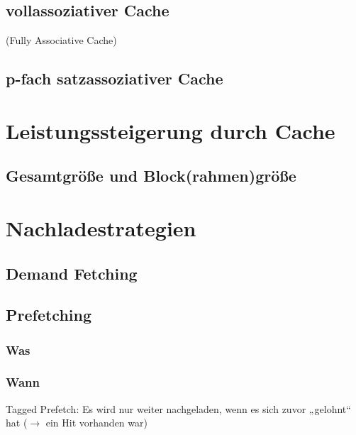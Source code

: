\subsection{vollassoziativer Cache}
(Fully Associative Cache)

\subsection{p-fach satzassoziativer Cache}

\section{Leistungssteigerung durch Cache}


\subsection{Gesamtgröße und Block(rahmen)größe}

\section{Nachladestrategien}
\subsection{Demand Fetching}
\subsection{Prefetching}
\subsubsection*{Was}
\subsubsection*{Wann}
Tagged Prefetch: Es wird nur weiter nachgeladen, wenn es sich zuvor „gelohnt“ hat ($\to$ ein Hit vorhanden war)

